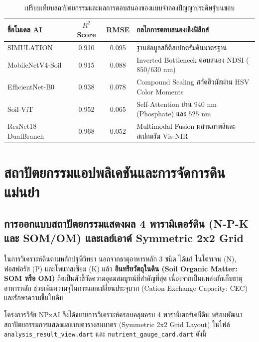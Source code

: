 \documentclass[12pt,a4paper,oneside]{book}
\begin{document}
\begin{table}[ht]
\caption{เปรียบเทียบสถาปัตยกรรมและผลการตอบสนองของแบบจำลองปัญญาประดิษฐ์บนขอบ}\label{tab:ai_models}
\centering
\begin{tabularx}{\textwidth}{p{3.8cm}ccY}
\toprule
\textbf{ชื่อโมเดล AI} & \textbf{$R^2$ Score} & \textbf{RMSE} & \textbf{กลไกการตอบสนองเชิงฟิสิกส์} \\
\midrule
SIMULATION & 0.910 & 0.095 & ฐานข้อมูลสถิติสเปกตรัมดินมาตรฐาน \\
MobileNetV4-Soil & 0.915 & 0.088 & Inverted Bottleneck ตอบสนอง NDSI ($850/630\text{ nm}$) \\
EfficientNet-B0 & 0.938 & 0.078 & Compound Scaling สกัดฮิวมัสผ่าน HSV Color Moments \\
Soil-ViT & 0.952 & 0.065 & Self-Attention ย่าน $940\text{ nm}$ (Phosphate) และ $525\text{ nm}$ \\
ResNet18-DualBranch & 0.968 & 0.052 & Multimodal Fusion ผสานภาพสีและสเปกตรัม Vis-NIR \\
\bottomrule
\end{tabularx}
\end{table}

\chapter{สถาปัตยกรรมแอปพลิเคชันและการจัดการดินแม่นยำ}

\section{การออกแบบสถาปัตยกรรมแสดงผล 4 พารามิเตอร์ดิน (N-P-K และ SOM/OM) และเลย์เอาต์ Symmetric 2x2 Grid}
ในการวิเคราะห์ดินตามหลักปฐพีวิทยา นอกจากธาตุอาหารหลัก 3 ชนิด ได้แก่ ไนโตรเจน (N), ฟอสฟอรัส (P) และโพแทสเซียม (K) แล้ว \textbf{อินทรียวัตถุในดิน (Soil Organic Matter: SOM หรือ OM)} ถือเป็นตัวชี้วัดความอุดมสมบูรณ์ที่สำคัญที่สุด เนื่องจากเป็นแหล่งกักเก็บธาตุอาหารหลัก ช่วยเพิ่มความจุในการแลกเปลี่ยนประจุบวก (Cation Exchange Capacity: CEC) และรักษาความชื้นในดิน

โครงการวิจัย NPxAI จึงได้ขยายการวิเคราะห์ครอบคลุมครบ 4 พารามิเตอร์เคมีดิน พร้อมพัฒนาสถาปัตยกรรมการแสดงผลแบบตารางสมมาตร (Symmetric 2x2 Grid Layout) ในไฟล์ \texttt{analysis\_result\_view.dart} และ \texttt{nutrient\_gauge\_card.dart} ดังนี้
\end{document}
